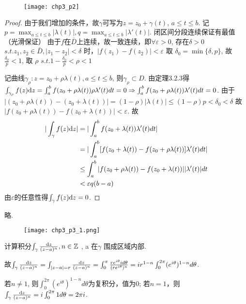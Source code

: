 \begin{figure}[h]
	\centering
	\texttt{[image: chp3\_p2]}
\end{figure}

\begin{proof}
	由于我们增加的条件，故$\gamma$可写为$z = z_0 + \gamma(t)$, $a \leq t \leq b$.
	记$p = \max_{a \leq t \leq b} \vert \lambda (t) \vert, q = \max_{a \leq t \leq b} \vert \lambda'(t) \vert$. 闭区间分段连续保证有最值（光滑保证）
	由于$f$在$\bar{D}$上连续，故一致连续，即$\forall \varepsilon > 0$, 存在$\delta > 0$ $s.t. z_1, z_2 \in \bar{D}, \vert z_1 - z_2 \vert < \delta$ 时，$\vert f(z_1) - f(z_2) \vert < \varepsilon$
	取 $\delta_0 = \min \{ \delta, p \}$, 故$\frac{\delta_0}{p} <1 $, 取 $\rho$ $ s.t. 1 - \frac{\delta_0}{p} < \rho < 1$
	
	记曲线$\gamma_\rho: z = z_0 + \rho \lambda(t), a \leq t \leq b$, 则$\gamma_\rho \subset D$. 由定理3.2.3得 $\int_{\gamma_\rho} f(z)\mathrm{d}z = \int_a^b f(z_0 + \rho \lambda(t)) \rho \lambda'(t) dt = 0 \Rightarrow \int_a^b f(z_0 + \rho \lambda(t)) \lambda'(t) dt = 0$.
	由于$\vert (z_0 + \rho \lambda(t)) - (z_0 + \lambda(t)) \vert = (1 - \rho) \vert \lambda(t) \vert \leq (1-\rho) p < \delta_0 < \delta$
	故$\vert f(z_0 + \rho \lambda(t)) - f(z_0 + \lambda(t)) \vert < \varepsilon$.
	故
	\begin{align*}
	\vert \int_\gamma f(z) \mathrm{d}z \vert &= \vert \int_a ^b f(z_0 + \lambda(t)) \lambda'(t) dt \vert \\
	&= \vert \int_a^b [f(z_0 + \lambda(t)) - f(z_0 + \rho \lambda(t))] \lambda'(t) dt \vert\\
	&\leq \int_a^b \vert f(z_0 + \rho \lambda(t)) - f(z_0 + \lambda(t)) \vert \vert \lambda'(t) \vert dt\\
	&< \varepsilon q(b-a)
	\end{align*}
	由$\varepsilon$的任意性得$\int_\gamma f(z) \mathrm{d}z = 0$.
	
\end{proof}




\begin{mypro}  略.
\end{mypro}

\begin{figure}[h]
	\centering
	\texttt{[image: chp3\_p3\_1.png]}
\end{figure}
\begin{eg}
	计算积分$\int_\gamma \frac{\mathrm{d}z}{(z - a)^n}, n \in \mathbb{Z}$ , a 在$\gamma$ 围成区域内部.
\end{eg}
\begin{jie}
	
	故$\int_\gamma \frac{\mathrm{d}z}{(z-a)^n} = \int_{|z-a| = r} \frac{\mathrm{d}z}{(z-a) ^n}  = \int_0 ^ \pi \frac{r e ^{i \theta} i d \theta}{(re^{i \theta})^n} = i r^{1-n} \int_0^{2\pi} (e^{i\theta})^{1-n} d \theta$.
	
	若$n \neq 1$, 则$\int_0 ^{2\pi} (e^{i \theta})^{1-n} d\theta$为复积分，值为0;
	若$n=1$，则$\int_\gamma \frac{\mathrm{d}z}{(z - a)^n} = i \int_0 ^{2\pi} 1 d\theta = 2\pi i$.
\end{jie}


